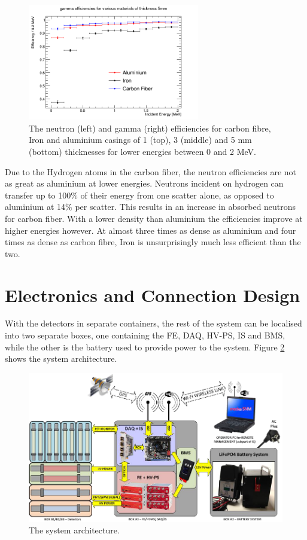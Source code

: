 \begin{figure}[htbp]
\begin{center}
\includegraphics[width=75mm]{Chapter6/figures/gamma5mmMaterialsEfficiency0-2MeV.png}
\caption{The neutron (left) and gamma (right) efficiencies for carbon fibre, Iron and aluminium casings of 1 (top), 3 (middle) and 5 mm (bottom) thicknesses for lower energies between 0 and 2 MeV.}
\label{fig:efficienciesMaterialZoom}
\end{center}
\end{figure}
\newpage

Due to the Hydrogen atoms in the carbon fiber, the neutron efficiencies are not as great as aluminium at lower energies. Neutrons incident on hydrogen can transfer up to 100\% of their energy from one scatter alone, as opposed to aluminium at 14\% per scatter. This results in an increase in absorbed neutrons for carbon fiber. With a lower density than aluminium the efficiencies improve at higher energies however. At almost three times as dense as aluminium and four times as dense as carbon fibre, Iron is unsurprisingly much less efficient than the two.

\section{Electronics and Connection Design}
With the detectors in separate containers, the rest of the system can be localised into two separate boxes, one containing the FE, DAQ, HV-PS, IS and BMS, while the other is the battery used to provide power to the system. Figure \ref{fig:systemArchitecture} shows the system architecture.

\begin{figure}[htbp]
\begin{center}
\includegraphics[width=130mm]{Chapter6/figures/systemArchitecture.png}
\caption{The system architecture.}
\label{fig:systemArchitecture}
\end{center}
\end{figure}

